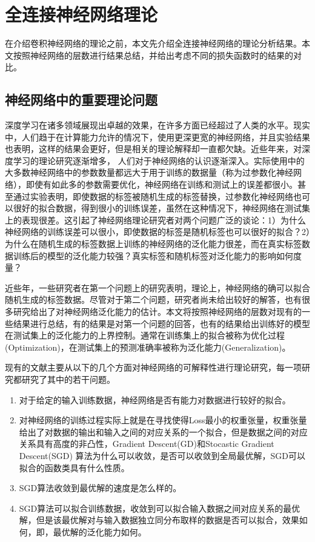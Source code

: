 \chapter{全连接神经网络理论}
在介绍卷积神经网络的理论之前，本文先介绍全连接神经网络的理论分析结果。本文按照神经网络的层数进行结果总结，并给出考虑不同的损失函数时的结果的对比。

\section{神经网络中的重要理论问题}
深度学习在诸多领域展现出卓越的效果，在许多方面已经超过了人类的水平。现实中，人们趋于在计算能力允许的情况下，使用更深更宽的神经网络，并且实验结果也表明，这样的结果会更好，但是相关的理论解释却一直都欠缺。近些年来，对深度学习的理论研究逐渐增多，	人们对于神经网络的认识逐渐深入。实际使用中的大多数神经网络中的参数数量都远大于用于训练的数据量（称为过参数化神经网络），即使有如此多的参数需要优化，神经网络在训练和测试上的误差都很小。甚至\citet{zhang2016understanding}通过实验表明，即使数据的标签被随机生成的标签替换，过参数化神经网络也可以很好的拟合数据，得到很小的训练误差，虽然在这种情况下，神经网络在测试集上的表现很差。这引起了神经网络理论研究者对两个问题广泛的谈论：1）为什么神经网络的训练误差可以很小，即使数据的标签是随机标签也可以很好的拟合？2）为什么在随机生成的标签数据上训练的神经网络的泛化能力很差，而在真实标签数据训练后的模型的泛化能力较强？真实标签和随机标签对泛化能力的影响如何度量？
\par
近些年，一些研究者在第一个问题上的研究表明，理论上，神经网络的确可以拟合随机生成的标签数据\cite{du2018gradient,allen2018convergence,du2018gradient2,zou2018stochastic}。尽管对于第二个问题，研究者尚未给出较好的解答，也有很多研究给出了对神经网络泛化能力的估计。本文将按照神经网络的层数对现有的一些结果进行总结，有的结果是对第一个问题的回答，也有的结果给出训练好的模型在测试集上的泛化能力的上界控制。通常在训练集上的拟合被称为优化过程(Optimization)，在测试集上的预测准确率被称为泛化能力(Generalization)。
\par
现有的文献主要从以下的几个方面对神经网络的可解释性进行理论研究，每一项研究都研究了其中的若干问题。
\begin{enumerate}
  \item 对于给定的输入训练数据，神经网络是否有能力对数据进行较好的拟合。
  \item 对神经网络的训练过程实际上就是在寻找使得Loss最小的权重张量，权重张量给出了对数据的输出和输入之间的对应关系的一个拟合，但是数据之间的对应关系具有高度的非凸性，Gradient Descent(GD)和Stocastic Gradient Descent(SGD) 算法为什么可以收敛，是否可以收敛到全局最优解，SGD可以拟合的函数类具有什么性质。
  \item SGD算法收敛到最优解的速度是怎么样的。
  \item SGD算法可以拟合训练数据，收敛到可以拟合输入数据之间对应关系的最优解，但是该最优解对与输入数据独立同分布取样的数据是否可以拟合，效果如何，即，最优解的泛化能力如何。
\end{enumerate}



